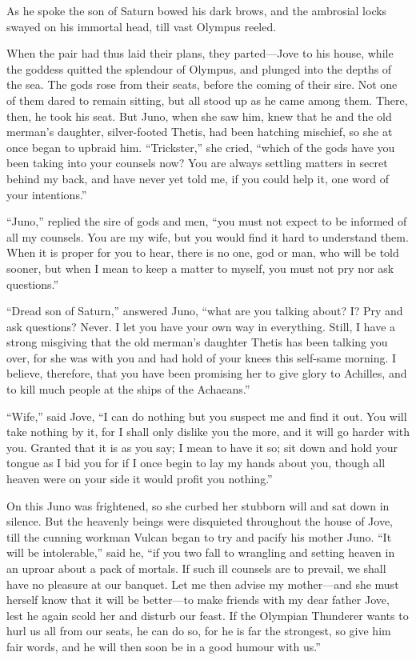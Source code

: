 As he spoke the son of Saturn bowed his dark brows, and the ambrosial
locks swayed on his immortal head, till vast Olympus reeled.

When the pair had thus laid their plans, they parted—Jove to his
house, while the goddess quitted the splendour of Olympus, and plunged
into the depths of the sea. The gods rose from their seats, before the
coming of their sire. Not one of them dared to remain sitting, but all
stood up as he came among them. There, then, he took his seat. But Juno,
when she saw him, knew that he and the old merman’s daughter,
silver-footed Thetis, had been hatching mischief, so she at once began to
upbraid him. “Trickster,” she cried, “which of the gods have you been
taking into your counsels now? You are always settling matters in secret
behind my back, and have never yet told me, if you could help it, one word
of your intentions.”

“Juno,” replied the sire of gods and men, “you must not expect to be
informed of all my counsels. You are my wife, but you would find it hard
to understand them. When it is proper for you to hear, there is no one,
god or man, who will be told sooner, but when I mean to keep a matter to
myself, you must not pry nor ask questions.”

“Dread son of Saturn,” answered Juno, “what are you talking about? I? Pry
and ask questions? Never. I let you have your own way in everything.
Still, I have a strong misgiving that the old merman’s daughter Thetis has
been talking you over, for she was with you and had hold of your knees
this self-same morning. I believe, therefore, that you have been promising
her to give glory to Achilles, and to kill much people at the ships of the
Achaeans.”

“Wife,” said Jove, “I can do nothing but you suspect me and find it out.
You will take nothing by it, for I shall only dislike you the more, and it
will go harder with you. Granted that it is as you say; I mean to have it
so; sit down and hold your tongue as I bid you for if I once begin to lay
my hands about you, though all heaven were on your side it would profit
you nothing.”

On this Juno was frightened, so she curbed her stubborn will and sat down
in silence. But the heavenly beings were disquieted throughout the house
of Jove, till the cunning workman Vulcan began to try and pacify his
mother Juno. “It will be intolerable,” said he, “if you two fall to
wrangling and setting heaven in an uproar about a pack of mortals. If such
ill counsels are to prevail, we shall have no pleasure at our banquet. Let
me then advise my mother—and she must herself know that it will be
better—to make friends with my dear father Jove, lest he again scold
her and disturb our feast. If the Olympian Thunderer wants to hurl us all
from our seats, he can do so, for he is far the strongest, so give him
fair words, and he will then soon be in a good humour with us.”

